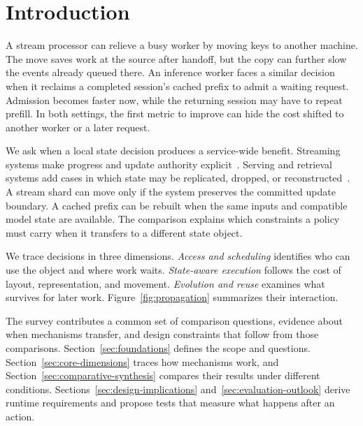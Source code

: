 \documentclass[manuscript]{acmart}
\begin{document}
\maketitle
\renewcommand{\shortauthors}{Zhang et al.}

\section{Introduction}

A stream processor can relieve a busy worker by moving keys to another machine. The move saves work at the source after handoff, but the copy can further slow the events already queued there. An inference worker faces a similar decision when it reclaims a completed session's cached prefix to admit a waiting request. Admission becomes faster now, while the returning session may have to repeat prefill. In both settings, the first metric to improve can hide the cost shifted to another worker or a later request.

We ask when a local state decision produces a service-wide benefit. Streaming systems make progress and update authority explicit~\cite{akidau2013millwheel,murray2013naiad,zaharia2013dstreams,akidau2015dataflow}. Serving and retrieval systems add cases in which state may be replicated, dropped, or reconstructed~\cite{kwon2023pagedattention,zheng2023sglang,zhang2026flowrag}. A stream shard can move only if the system preserves the committed update boundary. A cached prefix can be rebuilt when the same inputs and compatible model state are available. The comparison explains which constraints a policy must carry when it transfers to a different state object.

We trace decisions in three dimensions. \emph{Access and scheduling} identifies who can use the object and where work waits. \emph{State-aware execution} follows the cost of layout, representation, and movement. \emph{Evolution and reuse} examines what survives for later work. Figure~\ref{fig:propagation} summarizes their interaction.

The survey contributes a common set of comparison questions, evidence about when mechanisms transfer, and design constraints that follow from those comparisons. Section~\ref{sec:foundations} defines the scope and questions. Section~\ref{sec:core-dimensions} traces how mechanisms work, and Section~\ref{sec:comparative-synthesis} compares their results under different conditions. Sections~\ref{sec:design-implications} and~\ref{sec:evaluation-outlook} derive runtime requirements and propose tests that measure what happens after an action.
\end{document}
